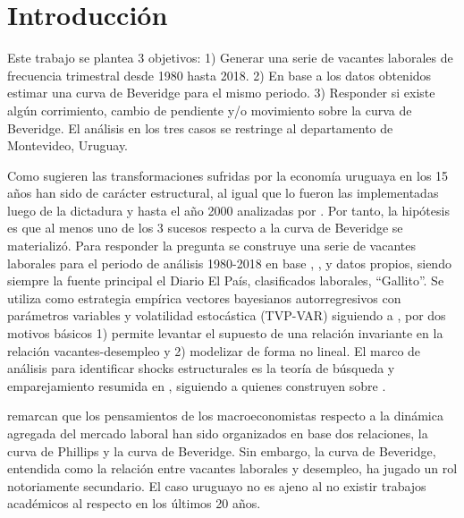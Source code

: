 \chapter{Introducción}

Este trabajo se plantea 3 objetivos: 1) Generar una serie de vacantes laborales de frecuencia trimestral desde 1980 hasta 2018. 2) En base a los datos obtenidos estimar una curva de Beveridge para el mismo periodo. 3) Responder si existe algún corrimiento, cambio de pendiente y/o movimiento sobre la curva de Beveridge. El análisis en los tres casos se restringe al departamento de Montevideo, Uruguay.

Como sugieren \cite{Bergara2017} las transformaciones sufridas por la economía uruguaya en los 15 años han sido de carácter estructural, al igual que lo fueron las implementadas luego de la dictadura y hasta el año 2000 analizadas por \cite{Antia2001}. Por tanto, la hipótesis es que al menos uno de los 3 sucesos respecto a la curva de Beveridge se materializó. Para responder la pregunta se construye una serie de vacantes laborales para el periodo de análisis 1980-2018 en base \cite{Rama1988}, \cite{Urrestarazu1997}, \cite{Ceres2012} y datos propios, siendo siempre la fuente principal el Diario El País, clasificados laborales, ``Gallito''. Se utiliza como estrategia empírica vectores bayesianos autorregresivos con parámetros variables y volatilidad estocástica (TVP-VAR) siguiendo a \cite{Nakajima2011, Benati2013, Primiceri2005, Lubik2016b}, por dos motivos básicos 1) permite levantar el supuesto de una relación invariante en la relación vacantes-desempleo y 2) modelizar de forma no lineal. El marco de análisis para identificar shocks estructurales es la teoría de búsqueda y emparejamiento resumida en \cite{Pissarides2000}, siguiendo a \cite{Benati2013} quienes construyen sobre \cite{Shimer2005}.

\cite{Blanchard1989} remarcan que los pensamientos de los macroeconomistas respecto a la dinámica agregada del mercado laboral han sido organizados en base dos relaciones, la curva de Phillips y la curva de Beveridge. Sin embargo, la curva de Beveridge, entendida como la relación entre vacantes laborales y desempleo, ha jugado un rol notoriamente secundario. El caso uruguayo no es ajeno al no existir trabajos académicos al respecto en los últimos 20 años.%
 
